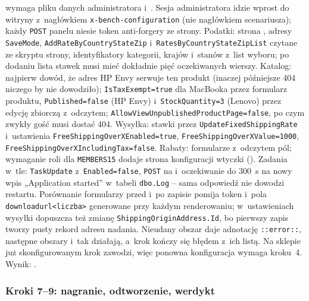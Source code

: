  wymaga pliku danych administratora i~.
Sesja administratora idzie wprost do witryny z~nagłówkiem \texttt{x-bench-configuration}
(nie nagłówkiem scenariusza); każdy \texttt{POST} panelu niesie token anti-forgery ze
strony. Podatki: strona
, adresy
\texttt{SaveMode}, \texttt{AddRateByCountryStateZip}
i~\texttt{RatesByCountryStateZipList} czytane ze skryptu strony, identyfikatory kategorii,
krajów i~stanów z~list wyboru; po dodaniu lista stawek musi mieć dokładnie pięć
oczekiwanych wierszy. Katalog: najpierw dowód, że adres HP Envy serwuje ten produkt
(inaczej późniejsze 404 niczego by nie dowodziło); \texttt{IsTaxExempt=true} dla MacBooka
przez formularz produktu, \texttt{Published=false} (HP Envy) i~\texttt{StockQuantity=3}
(Lenovo) przez edycję zbiorczą z~odczytem; \texttt{AllowViewUnpublishedProductPage=false},
po czym zwykły gość musi dostać 404. Wysyłka: stawki przez
\texttt{UpdateFixedShippingRate} i~ustawienia \texttt{FreeShippingOverXEnabled=true},
\texttt{FreeShippingOverXValue=1000}, \texttt{FreeShippingOverXIncludingTax=false}.
Rabaty: formularze  z~odczytem pól; wymaganie roli dla
\texttt{MEMBERS15} dodaje strona konfiguracji wtyczki
(). Zadania w~tle: \texttt{TaskUpdate}
z~\texttt{Enabled=false}, \texttt{POST} na 
i~oczekiwanie do 300~s na nowy wpis „Application
started” w~tabeli \texttt{dbo.Log} -- sama odpowiedź nie dowodzi restartu. Porównanie
formularzy przed i~po zapisie pomija token i~pola \texttt{downloadurl<liczba>} generowane
przy każdym renderowaniu; w~ustawieniach wysyłki dopuszcza też zmianę
\texttt{ShippingOriginAddress.Id}, bo pierwszy zapis tworzy pusty rekord adresu nadania.
Nieudany obszar daje adnotację \texttt{::error::}, następne obszary i~tak działają, a~krok
kończy się błędem z~ich listą. Na sklepie już skonfigurowanym krok zawodzi, więc ponowna
konfiguracja wymaga kroku~4. Wynik: .


\subsubsection{Kroki 7--9: nagranie, odtworzenie, werdykt}\label{sec:bench-krok7}

